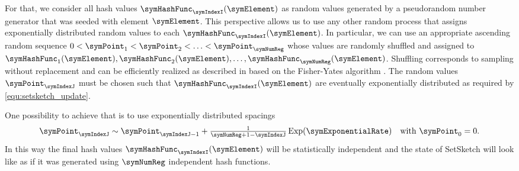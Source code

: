 \documentclass[sigconf, nonacm]{acmart}
\DeclareMathOperator*{\symExponential}{Exp}
\begin{document}
For that, we consider all hash values $\symHashFunc_\symIndexI(\symElement)$ as random values generated by a pseudorandom number generator that was seeded with element $\symElement$. This perspective allows us to use any other random process that assigns exponentially distributed random values to each $\symHashFunc_\symIndexI(\symElement)$. 
In particular, we can use an appropriate ascending random sequence $0<\symPoint_1<\symPoint_2<\ldots<\symPoint_\symNumReg$ whose values are randomly shuffled and assigned to $\symHashFunc_1(\symElement),\symHashFunc_2(\symElement),\ldots, \symHashFunc_\symNumReg(\symElement)$. Shuffling corresponds to sampling without replacement and can be efficiently realized as described in \cite{Ertl2018,Ertl2020} based on the Fisher-Yates algorithm \cite{Fisher1938}.
The random values $\symPoint_\symIndexJ$ must be chosen such that $\symHashFunc_\symIndexI(\symElement)$ are eventually exponentially distributed as required by \eqref{equ:setsketch_update}. 

One possibility to achieve that is to use exponentially distributed spacings \cite{Devroye1986}
\begin{equation}
\label{equ:uncorrelated}
{\textstyle
\symPoint_\symIndexJ \sim \symPoint_{\symIndexJ-1} + \frac{1}{\symNumReg + 1 - \symIndexJ}\symExponential(\symExponentialRate)
\quad
\textnormal{with}
\
\symPoint_0 = 0}.
\end{equation}
In this way the final hash values $\symHashFunc_\symIndexI(\symElement)$ will be statistically independent and the state of SetSketch will look like as if it was generated using $\symNumReg$ independent hash functions.
\end{document}
